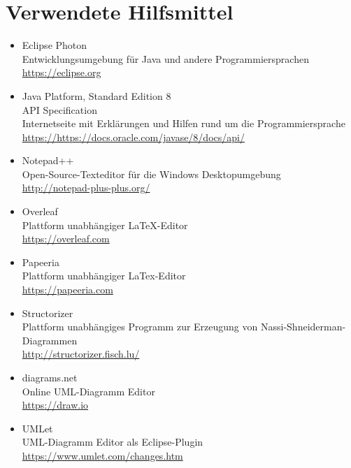 \chapter{Verwendete Hilfsmittel}
\label{Hilfsmittel}

\begin{itemize}
		\item Eclipse Photon\\ Entwicklungsumgebung f\"ur Java und andere Programmiersprachen \\\url{https://eclipse.org}
		\item Java Platform, Standard Edition 8\\API Specification\\ Internetseite mit Erklärungen und Hilfen rund um die Programmiersprache \\\url{https://https://docs.oracle.com/javase/8/docs/api/}
		\item Notepad++\\ Open-Source-Texteditor für die Windows Desktopumgebung\\\url{http://notepad-plus-plus.org/}
		\item Overleaf\\Plattform unabhängiger LaTeX-Editor \\\url{https://overleaf.com}
		\item Papeeria\\Plattform unabhängiger LaTex-Editor \\\url{https://papeeria.com}
		\item Structorizer \\Plattform unabhängiges Programm zur Erzeugung von Nassi-Shneiderman-Diagrammen \\\url{http://structorizer.fisch.lu/}
		\item diagrams.net \\Online UML-Diagramm Editor \\\url{https://draw.io}
		\item UMLet \\UML-Diagramm Editor als Eclipse-Plugin \\\url{https://www.umlet.com/changes.htm}
	\end{itemize}
\cleardoublepage